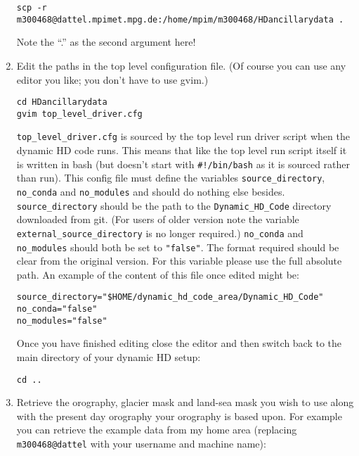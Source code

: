 \documentclass{article}
\begin{document}
\begin{enumerate}
\begin{lstlisting}[style=bash_input,breaklines=true]
scp -r m300468@dattel.mpimet.mpg.de:/home/mpim/m300468/HDancillarydata .
\end{lstlisting}
Note the ``.'' as the second argument here!
\item Edit the paths in the top level configuration file. (Of course you can use any editor you like; you don't have to use gvim.)
\begin{lstlisting}[style=bash_input]
cd HDancillarydata
gvim top_level_driver.cfg
\end{lstlisting}
\lstinline[style=bash_input]{top_level_driver.cfg} is sourced by the top level run driver script when the dynamic HD code runs. This means that like the top level run script itself it is written in bash (but doesn't start with \lstinline[style=bash_input]{#!/bin/bash} as it is sourced rather than run). This config file must define the variables \lstinline[style=bash_input]{source_directory}, \lstinline[style=bash_input]{no_conda} and \lstinline[style=bash_input]{no_modules} and should do nothing else besides. \lstinline[style=bash_input]{source_directory} should be the path to the \lstinline[style=bash_input]{Dynamic_HD_Code} directory downloaded from git. (For users of older version note the variable \lstinline[style=bash_input]{external_source_directory} is no longer required.) \lstinline[style=bash_input]{no_conda} and \lstinline[style=bash_input]{no_modules} should both be set to  \lstinline[style=bash_input]{"false"}. The format required should be clear from the original version. For this variable please use the full absolute path. An example of the content of this file once edited might be:
\begin{lstlisting}[style=bash_input,breaklines=true]
source_directory="$HOME/dynamic_hd_code_area/Dynamic_HD_Code"
no_conda="false"
no_modules="false"
\end{lstlisting}
Once you have finished editing close the editor and then switch back to the main directory of your dynamic HD setup:
\begin{lstlisting}[style=bash_input]
cd ..
\end{lstlisting}
\item Retrieve the orography, glacier mask and land-sea mask you wish to use along with the present day orography your orography is based upon. For example you can retrieve the example data from my home area (replacing \lstinline[style=bash_input]{m300468@dattel} with your username and machine name):
\begin{lstlisting}[style=bash_input,breaklines=true]

\end{lstlisting}
\end{enumerate}
\end{document}
